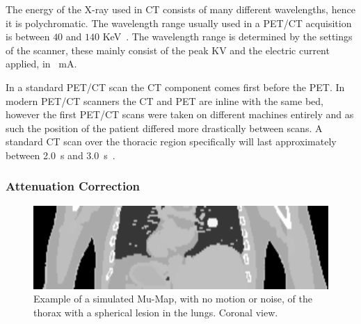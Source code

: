             The energy of the X-ray used in \gls{CT} consists of many different wavelengths, hence it is polychromatic. The wavelength range usually used in a \gls{PET}/\gls{CT} acquisition is between $40$ and $140$ \gls{KeV}~. The wavelength range is determined by the settings of the scanner, these mainly consist of the peak \gls{KV} and the electric current applied, in \SI{}{\milli\ampere}.
            
            In a standard \gls{PET}/\gls{CT} scan the \gls{CT} component comes first before the \gls{PET}. In modern \gls{PET}/\gls{CT} scanners the \gls{CT} and \gls{PET} are inline with the same bed, however the first \gls{PET}/\gls{CT} scans were taken on different machines entirely and as such the position of the patient differed more drastically between scans. A standard \gls{CT} scan over the thoracic region specifically will last approximately between \SI{2.0}{\second} and \SI{3.0}{\second}~.
        
            \subsubsection{Attenuation Correction} \label{sec:attenuation_correction}
                \begin{figure}
                    \centering
                    
                    \includegraphics[width=1.0\linewidth]{figures/background_mu_map_example.png}
                    
                    \captionsetup{singlelinecheck=false, justification=raggedright}
                    \caption{Example of a simulated \gls{Mu-Map}, with no motion or noise, of the thorax with a spherical lesion in the lungs. Coronal view.} \label{fig:combined_pet_ct_mu_map_example}
                \end{figure}
                
